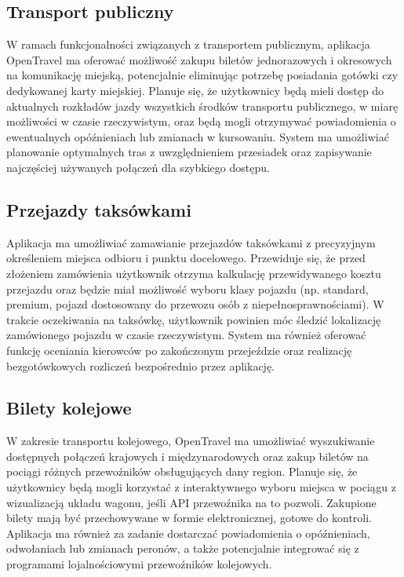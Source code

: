 \documentclass[a4paper,12pt]{article}
\begin{document}
\subsection*{Transport publiczny}
W ramach funkcjonalności związanych z transportem publicznym, aplikacja OpenTravel ma oferować możliwość zakupu biletów jednorazowych i okresowych na komunikację miejską, potencjalnie eliminując potrzebę posiadania gotówki czy dedykowanej karty miejskiej.
Planuje się, że użytkownicy będą mieli dostęp do aktualnych rozkładów jazdy wszystkich środków transportu publicznego, w miarę możliwości w czasie rzeczywistym, oraz będą mogli otrzymywać powiadomienia o ewentualnych opóźnieniach lub zmianach w kursowaniu.
System ma umożliwiać planowanie optymalnych tras z uwzględnieniem przesiadek oraz zapisywanie najczęściej używanych połączeń dla szybkiego dostępu.

\subsection*{Przejazdy taksówkami}
Aplikacja ma umożliwiać zamawianie przejazdów taksówkami z precyzyjnym określeniem miejsca odbioru i punktu docelowego.
Przewiduje się, że przed złożeniem zamówienia użytkownik otrzyma kalkulację przewidywanego kosztu przejazdu oraz będzie miał możliwość wyboru klasy pojazdu (np. standard, premium, pojazd dostosowany do przewozu osób z niepełnosprawnościami).
W trakcie oczekiwania na taksówkę, użytkownik powinien móc śledzić lokalizację zamówionego pojazdu w czasie rzeczywistym.
System ma również oferować funkcję oceniania kierowców po zakończonym przejeździe oraz realizację bezgotówkowych rozliczeń bezpośrednio przez aplikację.

\subsection*{Bilety kolejowe}
W zakresie transportu kolejowego, OpenTravel ma umożliwiać wyszukiwanie dostępnych połączeń krajowych i międzynarodowych oraz zakup biletów na pociągi różnych przewoźników obsługujących dany region.
Planuje się, że użytkownicy będą mogli korzystać z interaktywnego wyboru miejsca w pociągu z wizualizacją układu wagonu, jeśli API przewoźnika na to pozwoli.
Zakupione bilety mają być przechowywane w formie elektronicznej, gotowe do kontroli.
Aplikacja ma również za zadanie dostarczać powiadomienia o opóźnieniach, odwołaniach lub zmianach peronów, a także potencjalnie integrować się z programami lojalnościowymi przewoźników kolejowych.
\end{document}

